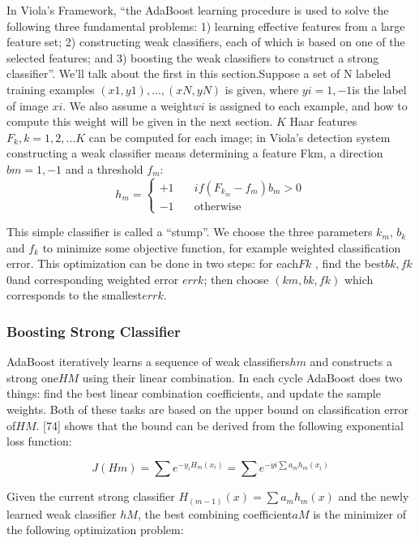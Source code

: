 \documentclass[12pt, twoside]{report}
\begin{document}
	\par
	In Viola’s Framework, ``the AdaBoost learning procedure is used to solve the following
	three fundamental problems: 1) learning effective features from a large feature set; 2)
	constructing weak classifiers, each of which is based on one of the selected features; and
	3) boosting the weak classifiers to construct a strong classifier''. We’ll talk about the
	first in this section.Suppose a set of N labeled training examples $(x1, y1), . . . ,(xN , yN )$ is given, where
	$yi = {1, −1} $is the label of image $xi$. We also assume a weight$ wi$ is assigned to each example, and how to compute this weight will be given in the next section. $K$ Haar features $F_k, k = 1, 2, . . . K$ can be computed for each image; in Viola’s detection system constructing a weak classifier means determining a feature Fkm, a direction $bm = {1, −1}$ and a threshold $f_m$:
	\[
		h_m = \begin{cases}
			+1  & \quad \text{$if (F_{k_m} - f_m) b_m > 0$} \\
			-1  & \quad \text{otherwise}
			\end{cases}
	\]
	\newpage
	\par
	This simple classifier is called a “stump”. We choose the three parameters $k_m$, $b_k$ and $f_k$ to minimize some objective function, for example weighted classification error. This
	optimization can be done in two steps: for each$ Fk$ , find the best$ bk, fk $0and corresponding
	weighted error $errk$; then choose $(km, bk, fk)$ which corresponds to the smallest$ errk$.
	\subsubsection{Boosting Strong Classifier}
	
	\par
	AdaBoost iteratively learns a sequence of weak classifiers$ hm$ and constructs a strong one$
	HM$ using their linear combination. In each cycle AdaBoost does two things: find the best
	linear combination coefficients, and update the sample weights. Both of these tasks are
	based on the upper bound on classification error of$ HM$. [74] shows that the bound can be
	derived from the following exponential loss function:
	
	\begin{equation}
	J(Hm)=\sum  e^{-y_iH_m(x_i)} =\sum e^{-yi \sum a_m h_m(x_i)} 
	\end{equation}
	
	Given the current strong classifier $H_(m-1)(x)=\sum a_m h_m (x)$ and the newly learned
	weak classifier $hM$, the best combining coefficient$ aM$ is the minimizer of the following
	optimization problem:
	
\end{document}
